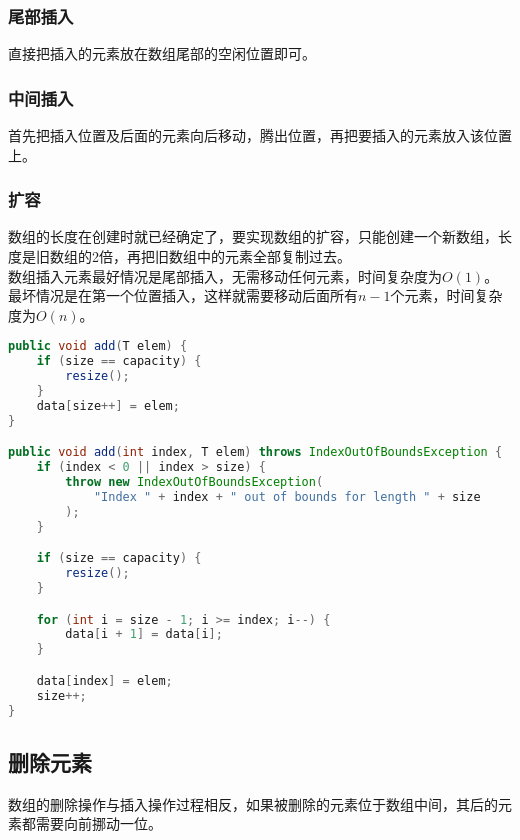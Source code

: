 \subsubsection{尾部插入}

直接把插入的元素放在数组尾部的空闲位置即可。

\subsubsection{中间插入}

首先把插入位置及后面的元素向后移动，腾出位置，再把要插入的元素放入该位置上。\\

\subsubsection{扩容}

数组的长度在创建时就已经确定了，要实现数组的扩容，只能创建一个新数组，长度是旧数组的2倍，再把旧数组中的元素全部复制过去。\\

数组插入元素最好情况是尾部插入，无需移动任何元素，时间复杂度为$ O(1) $。最坏情况是在第一个位置插入，这样就需要移动后面所有$ n - 1 $个元素，时间复杂度为$ O(n) $。\\


\begin{lstlisting}[language=Java]
public void add(T elem) {
    if (size == capacity) {
        resize();
    }
    data[size++] = elem;
}

public void add(int index, T elem) throws IndexOutOfBoundsException {
    if (index < 0 || index > size) {
        throw new IndexOutOfBoundsException(
            "Index " + index + " out of bounds for length " + size
        );
    }

    if (size == capacity) {
        resize();
    }

    for (int i = size - 1; i >= index; i--) {
        data[i + 1] = data[i];
    }

    data[index] = elem;
    size++;
}
\end{lstlisting}

\subsection{删除元素}

数组的删除操作与插入操作过程相反，如果被删除的元素位于数组中间，其后的元素都需要向前挪动一位。\\


